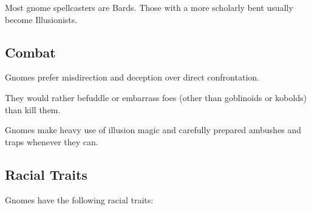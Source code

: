 Most gnome spellcasters are Bards. Those with a more scholarly bent usually become Illusionists.
\subsection{Combat}
Gnomes prefer misdirection and deception over direct confrontation.

They would rather befuddle or embarrass foes (other than goblinoids or kobolds) than kill them.

Gnomes make heavy use of illusion magic and carefully prepared ambushes and traps whenever they can.
\subsection{Racial Traits}
Gnomes have the following racial traits: 

